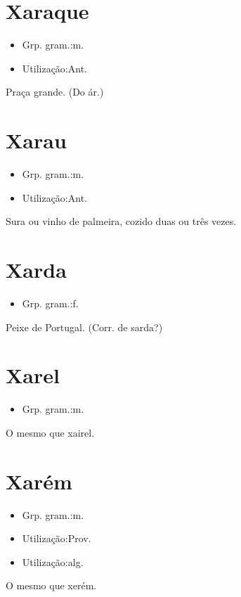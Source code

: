 \section{Xaraque}
\begin{itemize}
\item {Grp. gram.:m.}
\end{itemize}
\begin{itemize}
\item {Utilização:Ant.}
\end{itemize}
Praça grande.
(Do ár.)
\section{Xarau}
\begin{itemize}
\item {Grp. gram.:m.}
\end{itemize}
\begin{itemize}
\item {Utilização:Ant.}
\end{itemize}
Sura ou vinho de palmeira, cozido duas ou três vezes.
\section{Xarda}
\begin{itemize}
\item {Grp. gram.:f.}
\end{itemize}
Peixe de Portugal.
(Corr. de \textunderscore sarda\textunderscore ?)
\section{Xarel}
\begin{itemize}
\item {Grp. gram.:m.}
\end{itemize}
O mesmo que \textunderscore xairel\textunderscore .
\section{Xarém}
\begin{itemize}
\item {Grp. gram.:m.}
\end{itemize}
\begin{itemize}
\item {Utilização:Prov.}
\end{itemize}
\begin{itemize}
\item {Utilização:alg.}
\end{itemize}
O mesmo que \textunderscore xerém\textunderscore .
